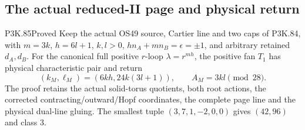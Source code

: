 \subsection{The actual reduced-II page and physical return}
\begin{statement}{P3K.85}{Proved}
Keep the actual OS49 source, Cartier line and two caps of P3K.84, with \(m=3k\), \(h=6l+1\), \(k,l>0\), \(hn_A+mn_B=\epsilon=\pm1\), and arbitrary retained \(d_A,d_B\). For the canonical full positive \(r\)-loop \(\lambda=r^{mh}\), the positive fan \(T_1\) has physical characteristic pair and return
\[(k_M,\ell_M)=(6kh,24k(3l+1)),\qquad A_M=3kl\pmod {28}.\]
The proof retains the actual solid-torus quotients, both root actions, the corrected contracting/outward/Hopf coordinates, the complete page line and the physical dual-line gluing. The smallest tuple \((3,7,1,-2,0,0)\) gives \((42,96)\) and class \(3\).
\end{statement}
